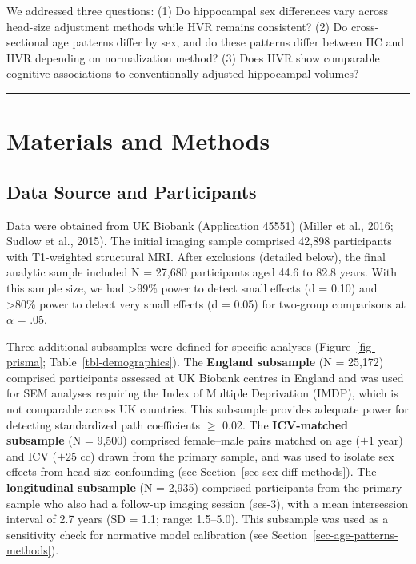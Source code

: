 \documentclass[
]{article}
\begin{document}
We addressed three questions: (1) Do hippocampal sex differences vary
across head-size adjustment methods while HVR remains consistent? (2) Do
cross-sectional age patterns differ by sex, and do these patterns differ
between HC and HVR depending on normalization method? (3) Does HVR show
comparable cognitive associations to conventionally adjusted hippocampal
volumes?

\begin{center}\rule{0.5\linewidth}{0.5pt}\end{center}

\section{Materials and Methods}\label{materials-and-methods}

\subsection{Data Source and
Participants}\label{data-source-and-participants}

Data were obtained from UK Biobank (Application 45551) (Miller et al.,
2016; Sudlow et al., 2015). The initial imaging sample comprised 42,898
participants with T1-weighted structural MRI. After exclusions (detailed
below), the final analytic sample included N = 27,680 participants aged
44.6 to 82.8 years. With this sample size, we had \textgreater99\% power
to detect small effects (d = 0.10) and \textgreater80\% power to detect
very small effects (d = 0.05) for two-group comparisons at \(\alpha\) =
.05.

Three additional subsamples were defined for specific analyses
(Figure~\ref{fig-prisma}; Table~\ref{tbl-demographics}). The
\textbf{England subsample} (N = 25,172) comprised participants assessed
at UK Biobank centres in England and was used for SEM analyses requiring
the Index of Multiple Deprivation (IMDP), which is not comparable across
UK countries. This subsample provides adequate power for detecting
standardized path coefficients \(\geq\) 0.02. The \textbf{ICV-matched
subsample} (N = 9,500) comprised female--male pairs matched on age
(\(\pm 1\) year) and ICV (\(\pm 25\) cc) drawn from the primary sample,
and was used to isolate sex effects from head-size confounding (see
Section~\ref{sec-sex-diff-methods}). The \textbf{longitudinal subsample}
(N = 2,935) comprised participants from the primary sample who also had
a follow-up imaging session (ses-3), with a mean intersession interval
of 2.7 years (SD = 1.1; range: 1.5--5.0). This subsample was used as a
sensitivity check for normative model calibration (see
Section~\ref{sec-age-patterns-methods}).
\end{document}

